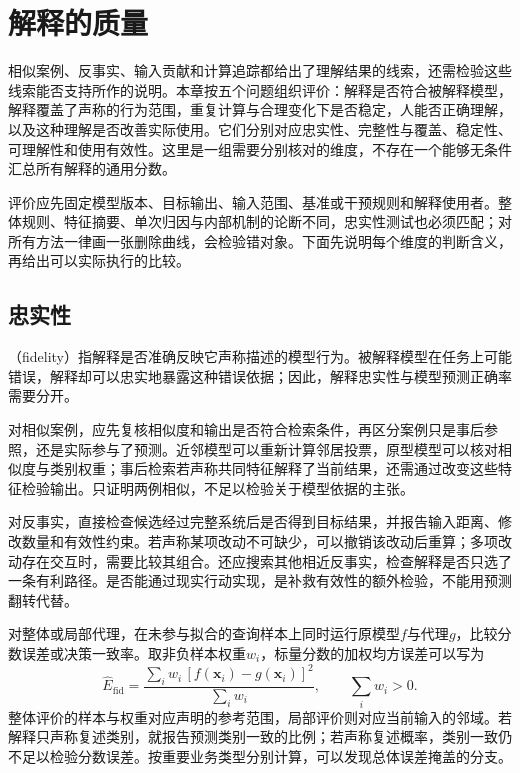 \section{解释的质量}
\label{sec:interpretability-quality}

相似案例、反事实、输入贡献和计算追踪都给出了理解结果的线索，还需检验这些线索能否支持所作的说明。本章按五个问题组织评价：解释是否符合被解释模型，解释覆盖了声称的行为范围，重复计算与合理变化下是否稳定，人能否正确理解，以及这种理解是否改善实际使用。它们分别对应忠实性、完整性与覆盖、稳定性、可理解性和使用有效性。这里是一组需要分别核对的维度，不存在一个能够无条件汇总所有解释的通用分数。

评价应先固定模型版本、目标输出、输入范围、基准或干预规则和解释使用者。整体规则、特征摘要、单次归因与内部机制的论断不同，忠实性测试也必须匹配；对所有方法一律画一张删除曲线，会检验错对象。下面先说明每个维度的判断含义，再给出可以实际执行的比较。

\subsection{忠实性}
\label{sec:interpretability-quality-fidelity}

（fidelity）指解释是否准确反映它声称描述的模型行为。被解释模型在任务上可能错误，解释却可以忠实地暴露这种错误依据；因此，解释忠实性与模型预测正确率需要分开。

对相似案例，应先复核相似度和输出是否符合检索条件，再区分案例只是事后参照，还是实际参与了预测。近邻模型可以重新计算邻居投票，原型模型可以核对相似度与类别权重；事后检索若声称共同特征解释了当前结果，还需通过改变这些特征检验输出。只证明两例相似，不足以检验关于模型依据的主张。

对反事实，直接检查候选经过完整系统后是否得到目标结果，并报告输入距离、修改数量和有效性约束。若声称某项改动不可缺少，可以撤销该改动后重算；多项改动存在交互时，需要比较其组合。还应搜索其他相近反事实，检查解释是否只选了一条有利路径。是否能通过现实行动实现，是补救有效性的额外检验，不能用预测翻转代替。

对整体或局部代理，在未参与拟合的查询样本上同时运行原模型$f$与代理$g$，比较分数误差或决策一致率。取非负样本权重$w_i$，标量分数的加权均方误差可以写为
\[
 \widehat E_{\mathrm{fid}}
 =\frac{\sum_i w_i\,[f(\bm{x}_i)-g(\bm{x}_i)]^2}
        {\sum_i w_i},\qquad \sum_iw_i>0.
\]
整体评价的样本与权重对应声明的参考范围，局部评价则对应当前输入的邻域。若解释只声称复述类别，就报告预测类别一致的比例；若声称复述概率，类别一致仍不足以检验分数误差。按重要业务类型分别计算，可以发现总体误差掩盖的分支。

